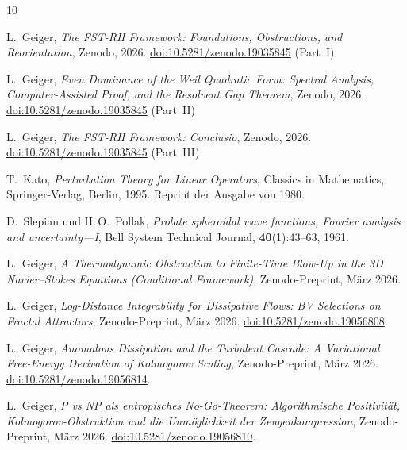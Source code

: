 \documentclass[12pt,a4paper]{article}
\theoremstyle{definition}
\theoremstyle{remark}
\begin{document}
\begin{thebibliography}{10}

L.~Geiger,
\emph{The FST-RH Framework: Foundations, Obstructions, and Reorientation},
Zenodo, 2026.
\href{https://doi.org/10.5281/zenodo.19035845}{doi:10.5281/zenodo.19035845} (Part~I)

L.~Geiger,
\emph{Even Dominance of the Weil Quadratic Form: Spectral Analysis, Computer-Assisted Proof, and the Resolvent Gap Theorem},
Zenodo, 2026.
\href{https://doi.org/10.5281/zenodo.19035845}{doi:10.5281/zenodo.19035845} (Part~II)

L.~Geiger,
\emph{The FST-RH Framework: Conclusio},
Zenodo, 2026.
\href{https://doi.org/10.5281/zenodo.19035845}{doi:10.5281/zenodo.19035845} (Part~III)


T.~Kato,
\emph{Perturbation Theory for Linear Operators},
Classics in Mathematics, Springer-Verlag, Berlin, 1995.
Reprint der Ausgabe von 1980.

D.~Slepian und H.\,O.~Pollak,
\emph{Prolate spheroidal wave functions, Fourier analysis and uncertainty---I},
Bell System Technical Journal, \textbf{40}(1):43--63, 1961.

L.~Geiger,
\emph{A Thermodynamic Obstruction to Finite-Time Blow-Up in the 3D Navier--Stokes Equations (Conditional Framework)},
Zenodo-Preprint, M\"arz 2026.

L.~Geiger,
\emph{Log-Distance Integrability for Dissipative Flows: BV Selections on Fractal Attractors},
Zenodo-Preprint, M\"arz 2026.
\href{https://doi.org/10.5281/zenodo.19056808}{doi:10.5281/zenodo.19056808}.

L.~Geiger,
\emph{Anomalous Dissipation and the Turbulent Cascade: A Variational Free-Energy Derivation of Kolmogorov Scaling},
Zenodo-Preprint, M\"arz 2026.
\href{https://doi.org/10.5281/zenodo.19056814}{doi:10.5281/zenodo.19056814}.

L.~Geiger,
\emph{P vs NP als entropisches No-Go-Theorem: Algorithmische Positivit\"at, Kolmogorov-Obstruktion und die Unm\"oglichkeit der Zeugenkompression},
Zenodo-Preprint, M\"arz 2026.
\href{https://doi.org/10.5281/zenodo.19056810}{doi:10.5281/zenodo.19056810}.


\end{thebibliography}
\end{document}
